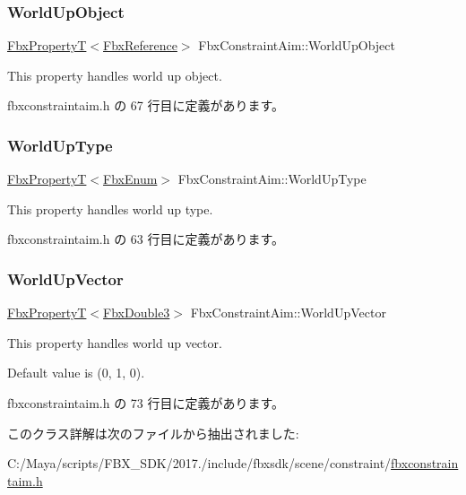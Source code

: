 \mbox{\label{class_fbx_constraint_aim_a9e0b0e5bff9ccd9e0774f2f59d484b7b}} 
\subsubsection{\texorpdfstring{World\+Up\+Object}{WorldUpObject}}
{\footnotesize\ttfamily \hyperlink{class_fbx_property_t}{Fbx\+PropertyT}$<$\hyperlink{fbxtypes_8h_a44df6a2eec915cf27cd481e5c5e48a24}{Fbx\+Reference}$>$ Fbx\+Constraint\+Aim\+::\+World\+Up\+Object}

This property handles world up object. 

 fbxconstraintaim.\+h の 67 行目に定義があります。

\mbox{\label{class_fbx_constraint_aim_a01c3d71386a124da25186e795dd29956}} 
\subsubsection{\texorpdfstring{World\+Up\+Type}{WorldUpType}}
{\footnotesize\ttfamily \hyperlink{class_fbx_property_t}{Fbx\+PropertyT}$<$\hyperlink{fbxtypes_8h_a9a28614cb4272a0ad7d748eda7f3d3e5}{Fbx\+Enum}$>$ Fbx\+Constraint\+Aim\+::\+World\+Up\+Type}

This property handles world up type. 

 fbxconstraintaim.\+h の 63 行目に定義があります。

\mbox{\label{class_fbx_constraint_aim_ae1d68f2cf7730299bbf63c55b52cb540}} 
\subsubsection{\texorpdfstring{World\+Up\+Vector}{WorldUpVector}}
{\footnotesize\ttfamily \hyperlink{class_fbx_property_t}{Fbx\+PropertyT}$<$\hyperlink{fbxtypes_8h_ae0a96f14cde566774c7553aa7523b7a7}{Fbx\+Double3}$>$ Fbx\+Constraint\+Aim\+::\+World\+Up\+Vector}

This property handles world up vector.

Default value is (0, 1, 0). 

 fbxconstraintaim.\+h の 73 行目に定義があります。



このクラス詳解は次のファイルから抽出されました\+:\begin{DoxyCompactItemize}
\item 
C\+:/\+Maya/scripts/\+F\+B\+X\+\_\+\+S\+D\+K/2017./include/fbxsdk/scene/constraint/\hyperlink{fbxconstraintaim_8h}{fbxconstraintaim.\+h}\end{DoxyCompactItemize}
